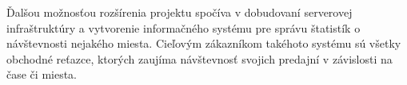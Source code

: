 Ďalšou  možnosťou rozšírenia projektu spočíva v dobudovaní serverovej infraštruktúry a vytvorenie informačného systému pre správu štatistík o návštevnosti nejakého miesta. Cieľovým zákazníkom takéhoto systému sú všetky obchodné reťazce, ktorých zaujíma návštevnosť svojich predajní v závislosti na čase či miesta.

































